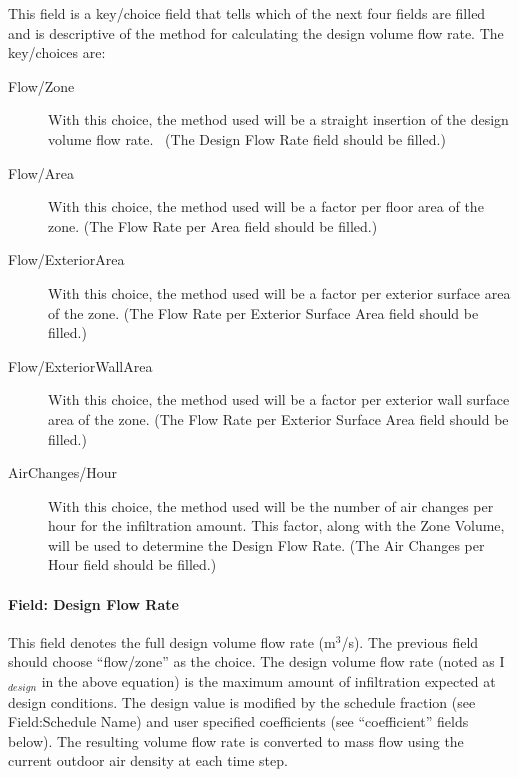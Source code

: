 This field is a key/choice field that tells which of the next four fields are filled and is descriptive of the method for calculating the design volume flow rate. The key/choices are:

\begin{description}

\item[Flow/Zone] With this choice, the method used will be a straight insertion of the design volume flow rate.~ (The Design Flow Rate field should be filled.)

\item[Flow/Area] With this choice, the method used will be a factor per floor area of the zone. (The Flow Rate per Area field should be filled.)

\item[Flow/ExteriorArea] With this choice, the method used will be a factor per exterior surface area of the zone. (The Flow Rate per Exterior Surface Area field should be filled.)

\item[Flow/ExteriorWallArea] With this choice, the method used will be a factor per exterior wall surface area of the zone. (The Flow Rate per Exterior Surface Area field should be filled.)

\item[AirChanges/Hour] With this choice, the method used will be the number of air changes per hour for the infiltration amount. This factor, along with the Zone Volume, will be used to determine the Design Flow Rate. (The Air Changes per Hour field should be filled.)

\end{description}

\paragraph{Field: Design Flow Rate}\label{field-design-flow-rate}

This field denotes the full design volume flow rate (m\(^{3}\)/s). The previous field should choose ``flow/zone'' as the choice. The design volume flow rate (noted as I\(_{design}\) in the above equation) is the maximum amount of infiltration expected at design conditions. The design value is modified by the schedule fraction (see Field:Schedule Name) and user specified coefficients (see ``coefficient'' fields below). The resulting volume flow rate is converted to mass flow using the current outdoor air density at each time step.

